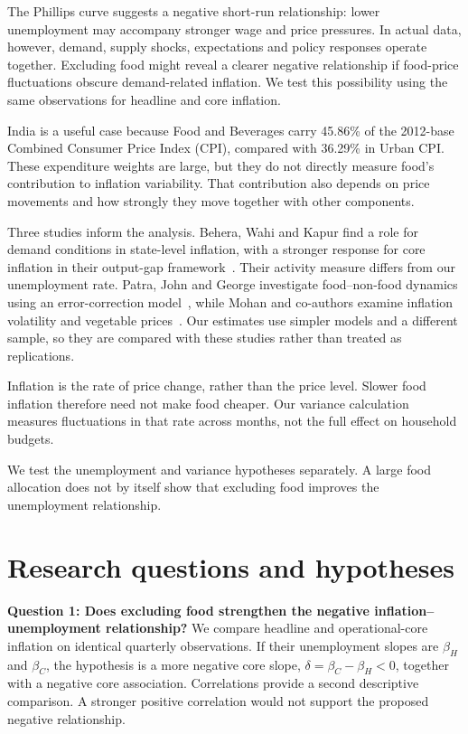 \documentclass[10pt,a4paper]{article}
\begin{document}
The Phillips curve suggests a negative short-run relationship: lower unemployment may accompany stronger wage and price pressures. In actual data, however, demand, supply shocks, expectations and policy responses operate together. Excluding food might reveal a clearer negative relationship if food-price fluctuations obscure demand-related inflation. We test this possibility using the same observations for headline and core inflation.

India is a useful case because Food and Beverages carry 45.86\% of the 2012-base Combined Consumer Price Index (CPI), compared with 36.29\% in Urban CPI. These expenditure weights are large, but they do not directly measure food's contribution to inflation variability. That contribution also depends on price movements and how strongly they move together with other components.

Three studies inform the analysis. Behera, Wahi and Kapur find a role for demand conditions in state-level inflation, with a stronger response for core inflation in their output-gap framework~\cite{behera2017}. Their activity measure differs from our unemployment rate. Patra, John and George investigate food--non-food dynamics using an error-correction model~\cite{patra2024}, while Mohan and co-authors examine inflation volatility and vegetable prices~\cite{mohan2026}. Our estimates use simpler models and a different sample, so they are compared with these studies rather than treated as replications.

Inflation is the rate of price change, rather than the price level. Slower food inflation therefore need not make food cheaper. Our variance calculation measures fluctuations in that rate across months, not the full effect on household budgets.

We test the unemployment and variance hypotheses separately. A large food allocation does not by itself show that excluding food improves the unemployment relationship.



\section{Research questions and hypotheses}

\textbf{Question 1: Does excluding food strengthen the negative inflation--unemployment relationship?} We compare headline and operational-core inflation on identical quarterly observations. If their unemployment slopes are $\beta_H$ and $\beta_C$, the hypothesis is a more negative core slope, $\delta=\beta_C-\beta_H<0$, together with a negative core association. Correlations provide a second descriptive comparison. A stronger positive correlation would not support the proposed negative relationship.
\end{document}
